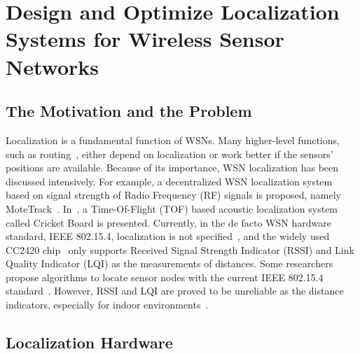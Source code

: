 \chapter{Design and Optimize Localization Systems for Wireless Sensor Networks}\label{s:loc}%
\section{The Motivation and the Problem}
Localization is a fundamental function of WSNs. Many higher-level functions, such as routing~\cite{AkyildizWMeshNetworkSurvey}, either depend on localization or work better if the sensors' positions are available. Because of its importance, WSN localization has been discussed intensively. For example, a decentralized WSN localization system based on signal strength of Radio Frequency (RF) signals is proposed, namely MoteTrack~\cite{WelshMoteTrack_LoCA2005-PUC}. In~\cite{PariyanthaCricketBoardPhd}, a Time-Of-Flight (TOF) based acoustic localization system called Cricket Board is presented. Currently, in the de facto WSN hardware standard, IEEE 802.15.4, localization is not specified~\cite{Standard802.15.4.2003}, and the widely used CC2420 chip~\cite{CC2420DataSheet} only supports Received Signal Strength Indicator (RSSI) and Link Quality Indicator (LQI) as the measurements of distances. Some researchers propose algorithms to locate sensor nodes with the current IEEE 802.15.4 standard~\cite{WelshMoteTrack_LoCA2005-PUC,NiculescuPositioning_survey}. However, RSSI and LQI are proved to be unreliable as the distance indicators, especially for indoor environments~\cite{LymberopoulosEmpiricalAna,Polastre-telos}.


\section{Localization Hardware}
